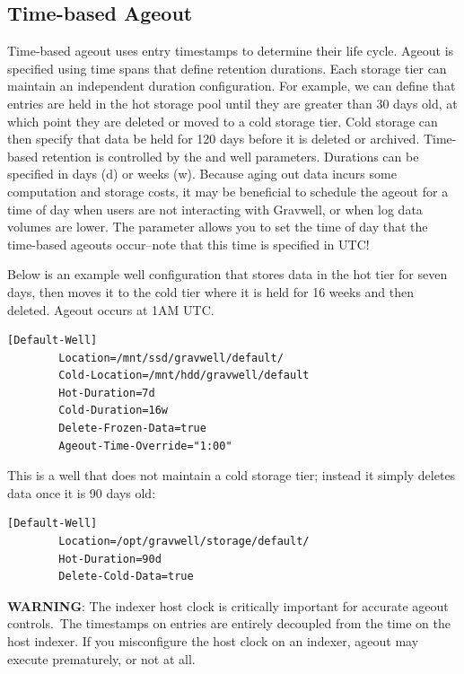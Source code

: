 {{\subsection{Time-based Ageout}

Time-based ageout uses entry timestamps to determine their life cycle.
Ageout is specified using time spans that define retention durations.
Each storage tier can maintain an independent duration configuration.
For example, we can define that entries are held in the hot storage
pool until they are greater than 30 days old, at which point they are
deleted or moved to a cold storage tier. Cold storage can then specify
that data be held for 120 days before it is deleted or archived.
Time-based retention is controlled by the  and
 well parameters. Durations can be specified in days
(d) or weeks (w). Because aging out data incurs some computation and
storage costs, it may be beneficial to schedule the ageout for a time of
day when users are not interacting with Gravwell, or when log data
volumes are lower. The  parameter allows you to
set the time of day that the time-based ageouts occur--note that
this time is specified in UTC!

Below is an example well configuration that stores data in the hot tier
for seven days, then moves it to the cold tier where it is held for 16
weeks and then deleted. Ageout occurs at 1AM UTC.

\begin{Verbatim}[breaklines=true]
[Default-Well]
        Location=/mnt/ssd/gravwell/default/
        Cold-Location=/mnt/hdd/gravwell/default
        Hot-Duration=7d
        Cold-Duration=16w
        Delete-Frozen-Data=true
        Ageout-Time-Override="1:00"
\end{Verbatim}

This is a well that does not maintain a cold storage tier; instead it simply
deletes data once it is 90 days old:

\begin{Verbatim}[breaklines=true]
[Default-Well]
        Location=/opt/gravwell/storage/default/
        Hot-Duration=90d
        Delete-Cold-Data=true
\end{Verbatim}

\textbf{WARNING}: The indexer host clock is critically important for accurate
ageout controls.~The timestamps on entries are entirely decoupled from
the time on the host indexer. If you misconfigure the host clock on an
indexer, ageout may execute prematurely, or not at all.

}}
